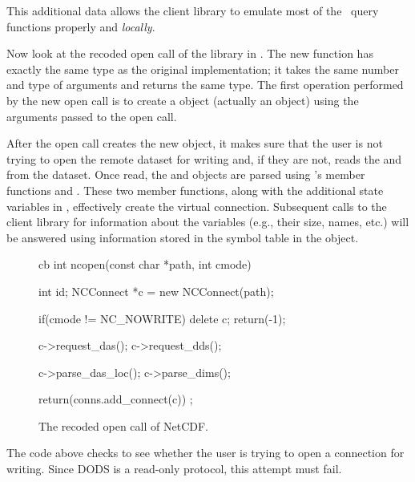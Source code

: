 This additional data allows the client library to emulate most of the
\netcdf\ query functions properly and \emph{locally}.

Now look at the recoded open call of the \netcdf library in
. The new function has exactly the same type as
the original implementation; it takes the same number and type of
arguments and returns the same type. The first operation performed by
the new open call is to create a  object (actually an
 object) using the arguments passed to the open call.

After the open call creates the new  object, it makes
sure that the user is not trying to open the remote dataset for
writing and, if they are not, reads the  and 
from the dataset. Once read, the  and  objects
are parsed using 's member functions
 and . These two member
functions, along with the additional state variables in
, effectively create the virtual connection.
Subsequent calls to the client library for information about the
variables (e.g., their size, names, etc.) will be answered using
information stored in the symbol table in the 
object.

\begin{figure}[htb]
\begin{vcode}{cb}
int
ncopen(const char *path, int cmode)
{
    int id;
    NCConnect *c = new NCConnect(path);

    if(cmode != NC_NOWRITE) {    
        delete c;  
        return(-1);
    }

    c->request_das();
    c->request_dds();

    c->parse_das_loc();
    c->parse_dims();

    return(conns.add_connect(c)) ;
}
\end{vcode}
\caption{The recoded open call of NetCDF.}
\label{fig,open}
\end{figure}

The code above checks to see whether the user is trying to open a
connection for writing.  Since DODS is a read-only protocol, this
attempt must fail.

